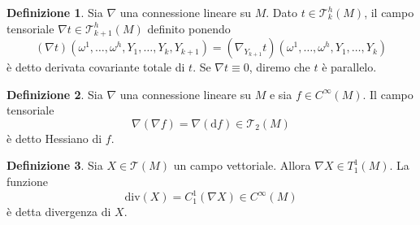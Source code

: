 \documentclass[a4paper,11pt]{article}
\theoremstyle{definition}
\newtheorem{definizione}{Definizione}[section]
\theoremstyle{theorem}
\newcommand{\dif}{\mathrm{d}}
\newcommand{\T}{\mathcal{T}}
\renewcommand{\div}{\textrm{div}}
\begin{document}
\begin{definizione}
	Sia $\nabla$ una connessione lineare su $M$. Dato $t\in\T^h_k(M)$, il campo tensoriale $\nabla t\in\T^h_{k+1}(M)$ definito ponendo
	\[\left(\nabla t\right)(\omega^1,\dots,\omega^h,Y_1,\dots,Y_k,Y_{k+1})=\left(\nabla_{Y_{k+1}}t\right)(\omega^1,\dots,\omega^h,Y_1,\dots,Y_k)\]
	è detto derivata covariante totale di $t$. Se $\nabla t\equiv 0$, diremo che $t$ è parallelo.
\end{definizione}
\begin{definizione}
	Sia $\nabla$ una connessione lineare su $M$ e sia $f\in C^\infty(M)$. Il campo tensoriale
	\[\nabla\left(\nabla f\right)=\nabla\left(\dif f\right)\in\T_2(M)\]
	è detto Hessiano di $f$.
\end{definizione}
\begin{definizione}
	Sia $X\in\T(M)$ un campo vettoriale. Allora $\nabla X\in T^1_1(M)$. La funzione
	\[\div\left(X\right)=C^1_1\left(\nabla X\right)\in C^\infty(M)\]
	è detta divergenza di $X$.
\end{definizione}
\newpage
\end{document}
